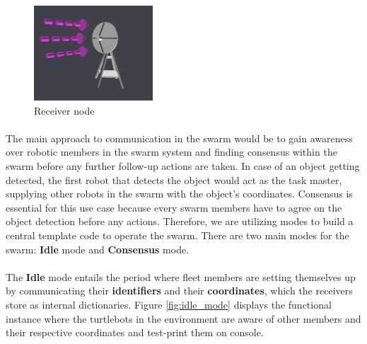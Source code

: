 \begin{figure}[!htb]
        \includegraphics[width=\linewidth]{assets/images/communication/devices/receiver.png}
        \caption{Receiver node}\label{fig:Receiver}
    \endminipage
\end{figure}

\paragraph*{}
The main approach to communication in the swarm would be to gain awareness over robotic members in the swarm system and finding consensus within the swarm before any further follow-up actions are taken. In case of an object getting detected, the first robot that detects the object would act as the task master, supplying other robots in the swarm with the object's coordinates. Consensus is essential for this use case because every swarm members have to agree on the object detection before any actions. Therefore, we are utilizing modes to build a central template code to operate the swarm. There are two main modes for the swarm: \textbf{Idle} mode and \textbf{Consensus} mode.

\paragraph*{}
The \textbf{Idle} mode entails the period where fleet members are setting themselves up by communicating their \textbf{identifiers} and their \textbf{coordinates}, which the receivers store as internal dictionaries. Figure \ref{fig:idle_mode} displays the functional instance where the turtlebots in the environment are aware of other members and their respective coordinates and test-print them on console.

